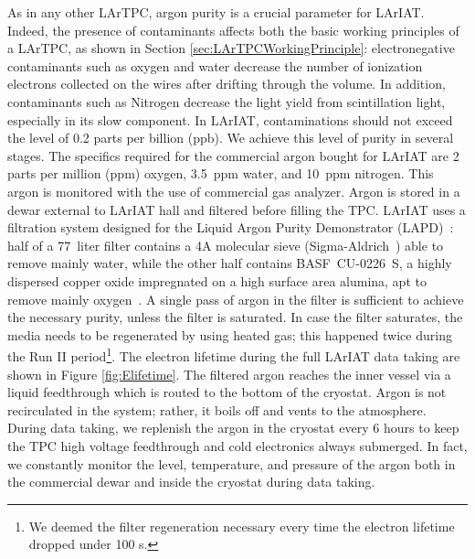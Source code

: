 As in any other LArTPC, argon purity is a crucial parameter for LArIAT. Indeed, the presence of contaminants affects both the basic working principles of a LArTPC, as shown in Section \ref{sec:LArTPCWorkingPrinciple}: electronegative contaminants such as oxygen and water decrease the number of ionization electrons collected on the wires after drifting through the volume. In addition, contaminants such as Nitrogen decrease the light yield from scintillation light, especially in its slow component.
In LArIAT, contaminations should not exceed the level of 0.2 parts per billion (ppb). We achieve this level of purity in several stages. The specifics required for the commercial argon bought for LArIAT are 2 parts per million (ppm) oxygen, 3.5~ppm water, and 10~ppm nitrogen. This argon is monitored with the use of commercial gas analyzer.
Argon is stored in a dewar external to LArIAT hall and filtered before filling the TPC. %
LArIAT uses a filtration system designed for the Liquid Argon Purity Demonstrator (LAPD)~\cite{LAPD}: half of a 77~liter filter contains a 4A molecular sieve (Sigma-Aldrich~\cite{sigma-aldrich}) able to remove mainly water, while the other half contains BASF~CU-0226~S, a highly dispersed copper oxide impregnated on a high surface area alumina, apt to remove mainly oxygen~\cite{basf}. A single pass of argon in the filter is sufficient to achieve the necessary purity, unless the filter is saturated. In case the filter saturates, the media needs to be regenerated by using heated gas; this happened twice during the Run II period\footnote{We deemed the filter regeneration necessary every time the electron lifetime dropped under 100 \textmu s.}. The electron lifetime during the full LArIAT data taking are shown in Figure \ref{fig:Elifetime}.
The filtered argon reaches the inner vessel via a liquid feedthrough which is routed to the bottom of the cryostat. Argon is not recirculated in the system; rather, it boils off and vents to the atmosphere. During data taking, we replenish the argon in the cryostat every 6 hours to keep the TPC high voltage feedthrough and cold electronics always submerged. In fact, we constantly monitor the level, temperature, and pressure of the argon both in the commercial dewar and inside the cryostat during data taking. 
